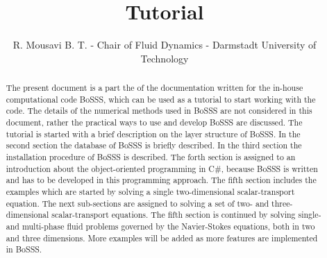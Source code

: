 \documentclass[11pt,twoside,a4paper]{fdyartcl}
\title{Tutorial}
\author{R. Mousavi B. T. - Chair of Fluid Dynamics - Darmstadt University of Technology}
\begin{document}

\setcounter{page}{1} %

\maketitle

\begin{abstract}
The present document is a part the of the documentation written for the in-house computational code BoSSS, which can be used as a tutorial to start working with the code. The details of the numerical methods used in BoSSS are not considered in this document, rather the practical ways to use and develop BoSSS are discussed. The tutorial is started with a brief description on the layer structure of BoSSS. In the second section the database of BoSSS is briefly described. In the third section the installation procedure of BoSSS is described. The forth section is assigned to an introduction about the object-oriented programming in C\#, because BoSSS is written and has to be developed in this programming approach. The fifth section includes the examples which are started by solving a single two-dimensional scalar-transport equation. The next sub-sections are assigned to solving a set of two- and three-dimensional scalar-transport equations. The fifth section is continued by solving single- and multi-phase fluid problems governed by the Navier-Stokes equations, both in two and three dimensions. More examples will be added as more features are implemented in BoSSS.
\end{abstract}
\end{document}
